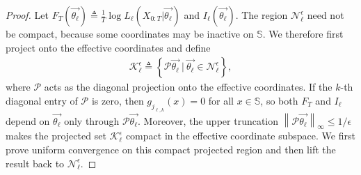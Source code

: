 \documentclass[pdflatex,sn-mathphys-num]{sn-jnl}%
\theoremstyle{thmstyleone}%
\theoremstyle{thmstyletwo}%
\theoremstyle{thmstylethree}%
\begin{document}
\begin{appendices}
\begin{proof}
    Let $F_T\left(\overrightarrow{\theta_\ell}\right)\triangleq \frac{1}{T}\log L_\ell\left(X_{0:T}\big|\overrightarrow{\theta_\ell}\right)$ and $I_\ell\left(\overrightarrow{\theta_\ell}\right)$.
    The region $\mathcal N_\ell^\epsilon$ need not be compact, because some coordinates may be inactive on $\mathbb S$.
    We therefore first project onto the effective coordinates and define
    \begin{align*}
        \mathcal K_\ell^\epsilon
        \triangleq
        \left\{\mathcal P\overrightarrow{\theta_\ell}~\Big|~
        \overrightarrow{\theta_\ell}\in\mathcal N_\ell^\epsilon\right\},
    \end{align*}
    where $\mathcal P$ acts as the diagonal projection onto the effective coordinates.
    If the $k$-th diagonal entry of $\mathcal P$ is zero, then $g_{j_{\ell,k}}(x)=0$ for all $x\in\mathbb S$, so both $F_T$ and $I_\ell$ depend on $\overrightarrow{\theta_\ell}$ only through $\mathcal P\overrightarrow{\theta_\ell}$.
    Moreover, the upper truncation $\left\|\mathcal P\overrightarrow{\theta_\ell}\right\|_\infty\leq1/\epsilon$ makes the projected set $\mathcal K_\ell^\epsilon$ compact in the effective coordinate subspace.
    We first prove uniform convergence on this compact projected region and then lift the result back to $\mathcal N_\ell^\epsilon$.


\end{proof}
\end{appendices}
\end{document}
